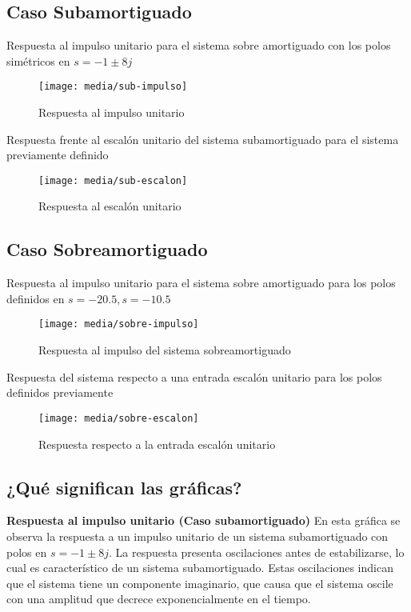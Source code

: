 \documentclass[conference]{IEEEtran}
\begin{document}
	\subsection{Caso Subamortiguado}
	
	Respuesta al impulso unitario para el sistema sobre amortiguado con los polos simétricos en $ s = -1 \pm 8j$
	\begin{figure}[h]
		\centering
		\texttt{[image: media/sub-impulso]}
		\caption{Respuesta al impulso unitario}
		\label{fig:sub-impulso}
	\end{figure}
	
	Respuesta frente al escalón unitario del sistema subamortiguado para el sistema previamente definido
	
	\begin{figure}[h]
		\centering
		\texttt{[image: media/sub-escalon]}
		\caption{Respuesta al escalón unitario}
		\label{fig:sub-escalon}
	\end{figure}
	
	
	\subsection{Caso Sobreamortiguado}
	
	Respuesta al impulso unitario para el sistema sobre amortiguado para los polos definidos en $ s = -20.5, s = - 10.5$
	
	\begin{figure}[h]
		\centering
		\texttt{[image: media/sobre-impulso]}
		\caption{Respuesta al impulso del sistema sobreamortiguado}
		\label{fig:sobre-impulso}
	\end{figure}
	Respuesta del sistema respecto a una entrada escalón unitario para los polos definidos previamente
	\begin{figure}[h]
		\centering
		\texttt{[image: media/sobre-escalon]}
		\caption{Respuesta respecto a la entrada escalón unitario}
		\label{fig:sobre-escalon}
	\end{figure}
	
	\subsection{¿Qué significan las gráficas?}
	
	\textbf{Respuesta al impulso unitario (Caso subamortiguado)}
	En esta gráfica se observa la respuesta a un impulso unitario de un sistema subamortiguado con polos en $s = -1 \pm 8j$. La respuesta presenta oscilaciones antes de estabilizarse, lo cual es característico de un sistema subamortiguado. Estas oscilaciones indican que el sistema tiene un componente imaginario, que causa que el sistema oscile con una amplitud que decrece exponencialmente en el tiempo.
	
\end{document}
